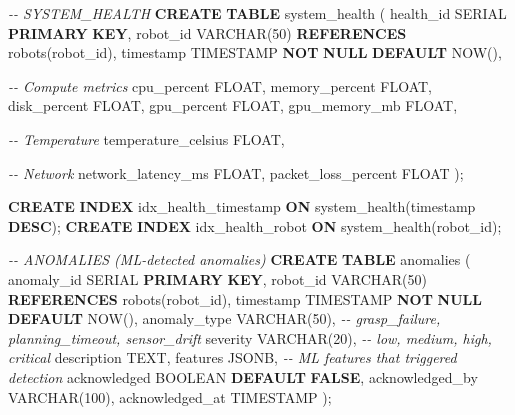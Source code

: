 \documentclass[
]{article}
\newenvironment{Shaded}{\begin{snugshade}}{\end{snugshade}}
\newcommand{\CommentTok}[1]{\textcolor[rgb]{0.56,0.35,0.01}{\textit{#1}}}
\newcommand{\DataTypeTok}[1]{\textcolor[rgb]{0.13,0.29,0.53}{#1}}
\newcommand{\DecValTok}[1]{\textcolor[rgb]{0.00,0.00,0.81}{#1}}
\newcommand{\KeywordTok}[1]{\textcolor[rgb]{0.13,0.29,0.53}{\textbf{#1}}}
\newcommand{\NormalTok}[1]{#1}
\begin{document}
\begin{Shaded}
\begin{Highlighting}[]
\CommentTok{{-}{-} SYSTEM\_HEALTH}
\KeywordTok{CREATE} \KeywordTok{TABLE}\NormalTok{ system\_health (}
\NormalTok{    health\_id SERIAL }\KeywordTok{PRIMARY} \KeywordTok{KEY}\NormalTok{,}
\NormalTok{    robot\_id }\DataTypeTok{VARCHAR}\NormalTok{(}\DecValTok{50}\NormalTok{) }\KeywordTok{REFERENCES}\NormalTok{ robots(robot\_id),}
    \DataTypeTok{timestamp} \DataTypeTok{TIMESTAMP} \KeywordTok{NOT} \KeywordTok{NULL} \KeywordTok{DEFAULT}\NormalTok{ NOW(),}

    \CommentTok{{-}{-} Compute metrics}
\NormalTok{    cpu\_percent }\DataTypeTok{FLOAT}\NormalTok{,}
\NormalTok{    memory\_percent }\DataTypeTok{FLOAT}\NormalTok{,}
\NormalTok{    disk\_percent }\DataTypeTok{FLOAT}\NormalTok{,}
\NormalTok{    gpu\_percent }\DataTypeTok{FLOAT}\NormalTok{,}
\NormalTok{    gpu\_memory\_mb }\DataTypeTok{FLOAT}\NormalTok{,}

    \CommentTok{{-}{-} Temperature}
\NormalTok{    temperature\_celsius }\DataTypeTok{FLOAT}\NormalTok{,}

    \CommentTok{{-}{-} Network}
\NormalTok{    network\_latency\_ms }\DataTypeTok{FLOAT}\NormalTok{,}
\NormalTok{    packet\_loss\_percent }\DataTypeTok{FLOAT}
\NormalTok{);}

\KeywordTok{CREATE} \KeywordTok{INDEX}\NormalTok{ idx\_health\_timestamp }\KeywordTok{ON}\NormalTok{ system\_health(}\DataTypeTok{timestamp} \KeywordTok{DESC}\NormalTok{);}
\KeywordTok{CREATE} \KeywordTok{INDEX}\NormalTok{ idx\_health\_robot }\KeywordTok{ON}\NormalTok{ system\_health(robot\_id);}

\CommentTok{{-}{-} ANOMALIES (ML{-}detected anomalies)}
\KeywordTok{CREATE} \KeywordTok{TABLE}\NormalTok{ anomalies (}
\NormalTok{    anomaly\_id SERIAL }\KeywordTok{PRIMARY} \KeywordTok{KEY}\NormalTok{,}
\NormalTok{    robot\_id }\DataTypeTok{VARCHAR}\NormalTok{(}\DecValTok{50}\NormalTok{) }\KeywordTok{REFERENCES}\NormalTok{ robots(robot\_id),}
    \DataTypeTok{timestamp} \DataTypeTok{TIMESTAMP} \KeywordTok{NOT} \KeywordTok{NULL} \KeywordTok{DEFAULT}\NormalTok{ NOW(),}
\NormalTok{    anomaly\_type }\DataTypeTok{VARCHAR}\NormalTok{(}\DecValTok{50}\NormalTok{),  }\CommentTok{{-}{-} \textquotesingle{}grasp\_failure\textquotesingle{}, \textquotesingle{}planning\_timeout\textquotesingle{}, \textquotesingle{}sensor\_drift\textquotesingle{}}
\NormalTok{    severity }\DataTypeTok{VARCHAR}\NormalTok{(}\DecValTok{20}\NormalTok{),  }\CommentTok{{-}{-} \textquotesingle{}low\textquotesingle{}, \textquotesingle{}medium\textquotesingle{}, \textquotesingle{}high\textquotesingle{}, \textquotesingle{}critical\textquotesingle{}}
\NormalTok{    description TEXT,}
\NormalTok{    features JSONB,  }\CommentTok{{-}{-} ML features that triggered detection}
\NormalTok{    acknowledged }\DataTypeTok{BOOLEAN} \KeywordTok{DEFAULT} \KeywordTok{FALSE}\NormalTok{,}
\NormalTok{    acknowledged\_by }\DataTypeTok{VARCHAR}\NormalTok{(}\DecValTok{100}\NormalTok{),}
\NormalTok{    acknowledged\_at }\DataTypeTok{TIMESTAMP}
\NormalTok{);}


\end{Highlighting}
\end{Shaded}
\end{document}
